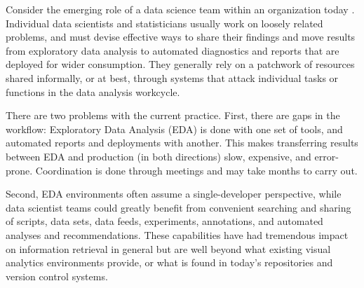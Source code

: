 

\maketitle





Consider the emerging role of a data science team within an
organization today \cite{Keim:2008:VAS}.
%
Individual data scientists and statisticians usually work on loosely
related problems, and must devise effective ways to share their findings
and move results from exploratory data analysis to automated diagnostics
and reports that are deployed for wider consumption.
They generally rely on a patchwork of resources shared informally,
or at best, through systems that attack individual tasks or functions
in the data analysis workcycle. %

There are two problems with the current practice. First, there are
gaps in the workflow: Exploratory Data Analysis (EDA) is done with one
set of tools, and automated reports and deployments with another. This
makes transferring results between EDA and production (in both
directions) slow, expensive, and error-prone. Coordination is done
through meetings and may take months to carry out.

Second, EDA environments often assume a single-developer perspective,
while data scientist teams could greatly benefit from convenient searching
and sharing of scripts, data sets, data feeds, experiments, annotations,
and automated analyses and recommendations. These capabilities have had
tremendous impact on information retrieval in general but are well
beyond what existing visual analytics environments provide, or what
is found in today's repositories and version control
systems.\cite{Koren:2009:FIT}

